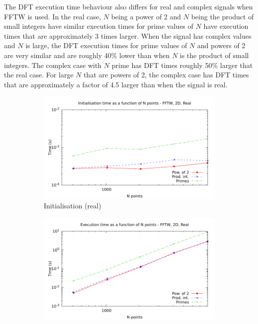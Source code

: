 \documentclass[12pt, a4paper]{article} \setlength{\textheight}{24cm}
\begin{document}
The DFT execution time behaviour also differs for real and complex
signals when FFTW is used. In the real case, $N$ being a power of 2
and $N$ being the product of small integers have similar execution
times for prime values of $N$ have execution times that are
approximately 3 times larger. When the signal has complex values and
$N$ is large, the DFT execution times for prime values of $N$ and
powers of 2 are very similar and are roughly 40\% lower than when $N$
is the product of small integers. The complex case with $N$ prime has
DFT times roughly 50\% larger that the real case. For large $N$ that
are powers of 2, the complex case has DFT times that are approximately
a factor of 4.5 larger than when the signal is real.

\begin{figure}[H]
  \centering
  \begin{subfigure}{.5\textwidth}
    \centering
    \includegraphics[width=.9\linewidth]{graphs/2d-fftw-init-r.pdf}
    \caption{Initialisation (real)}
    \label{2DFFTWRI}
  \end{subfigure}%
  \begin{subfigure}{.5\textwidth}
    \centering
    \includegraphics[width=.9\linewidth]{graphs/2d-fftw-exec-r.pdf}

\end{subfigure}
\end{figure}
\end{document}
